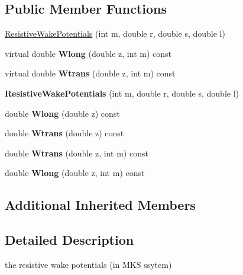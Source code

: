 \subsection*{Public Member Functions}
\begin{DoxyCompactItemize}
\item 
\hyperlink{classResistiveWakePotentials_a6f109fb21a76cd90350f4046767ec699}{Resistive\+Wake\+Potentials} (int m, double r, double s, double l)
\item 
\mbox{\label{classResistiveWakePotentials_a3dd8bca3fc9ec8c91841484447d40820}} 
virtual double {\bfseries Wlong} (double z, int m) const
\item 
\mbox{\label{classResistiveWakePotentials_a15d00eaca552a5d4a110f428a1a55e40}} 
virtual double {\bfseries Wtrans} (double z, int m) const
\item 
\mbox{\label{classResistiveWakePotentials_a6f109fb21a76cd90350f4046767ec699}} 
{\bfseries Resistive\+Wake\+Potentials} (int m, double r, double s, double l)
\item 
\mbox{\label{classResistiveWakePotentials_ae2bf2edba99651463181c3575e6a6ab3}} 
double {\bfseries Wlong} (double z) const
\item 
\mbox{\label{classResistiveWakePotentials_a01381b794edbc3af6d360cd73ba28d13}} 
double {\bfseries Wtrans} (double z) const
\item 
\mbox{\label{classResistiveWakePotentials_a15d00eaca552a5d4a110f428a1a55e40}} 
double {\bfseries Wtrans} (double z, int m) const
\item 
\mbox{\label{classResistiveWakePotentials_a3dd8bca3fc9ec8c91841484447d40820}} 
double {\bfseries Wlong} (double z, int m) const
\end{DoxyCompactItemize}
\subsection*{Additional Inherited Members}


\subsection{Detailed Description}
the resistive wake potentials (in M\+KS ssytem) 

